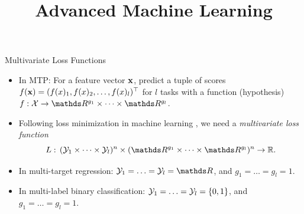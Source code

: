 \documentclass[11pt,compress,t,notes=noshow, xcolor=table]{beamer}
\title{Advanced Machine Learning}
\date{}
\begin{document}



\sloppy


\begin{frame}{Multivariate Loss Functions}
	\begin{itemize}
		\item In MTP: For a feature vector $\mathbf{x}$, predict a tuple of scores $f(\mathbf{x}) = (f(x)_1, f(x)_2, \ldots, f(x)_l)^\top$ for $l$ tasks with a function (hypothesis) $f: \Xspace \rightarrow \R^{g_1} \times \cdots \times \R^{g_l} $.
        
		\item Following loss minimization in machine learning , we need a \emph{multivariate loss function} 
		$$
		L: \, (\Yspace_1 \times \cdots \times \Yspace_l)^n \times (\R^{g_1} \times \cdots \times \R^{g_l})^n \rightarrow \mathbb{R}.
		$$ 

        \item In multi-target regression: $\Yspace_1 = \ldots = \Yspace_l = \R$, and $g_1 = \ldots = g_l = 1$.

        \item In multi-label binary classification: $\mathcal{Y}_1 =  \ldots = \mathcal{Y}_l = \{0, 1\}$, and $g_1 = \ldots = g_l = 1$. %
	\end{itemize}
	
\end{frame}
\end{document}
